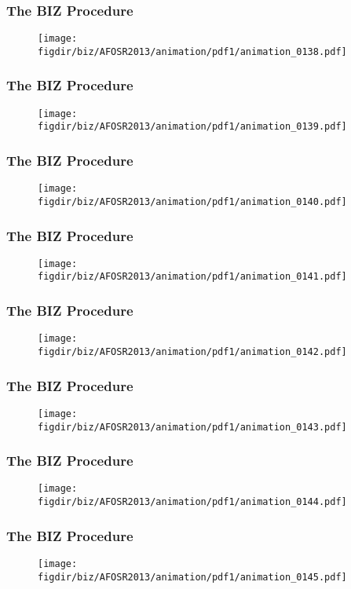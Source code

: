 \documentclass[13pt]{beamer}
\newcommand{\figdir}{../../fig}
\begin{document}
\begin{frame}\frametitle{The BIZ Procedure}\begin{figure}\texttt{[image: \\figdir/biz/AFOSR2013/animation/pdf1/animation\_0138.pdf]}\end{figure}\end{frame}
\begin{frame}\frametitle{The BIZ Procedure}\begin{figure}\texttt{[image: \\figdir/biz/AFOSR2013/animation/pdf1/animation\_0139.pdf]}\end{figure}\end{frame}
\begin{frame}\frametitle{The BIZ Procedure}\begin{figure}\texttt{[image: \\figdir/biz/AFOSR2013/animation/pdf1/animation\_0140.pdf]}\end{figure}\end{frame}
\begin{frame}\frametitle{The BIZ Procedure}\begin{figure}\texttt{[image: \\figdir/biz/AFOSR2013/animation/pdf1/animation\_0141.pdf]}\end{figure}\end{frame}
\begin{frame}\frametitle{The BIZ Procedure}\begin{figure}\texttt{[image: \\figdir/biz/AFOSR2013/animation/pdf1/animation\_0142.pdf]}\end{figure}\end{frame}
\begin{frame}\frametitle{The BIZ Procedure}\begin{figure}\texttt{[image: \\figdir/biz/AFOSR2013/animation/pdf1/animation\_0143.pdf]}\end{figure}\end{frame}
\begin{frame}\frametitle{The BIZ Procedure}\begin{figure}\texttt{[image: \\figdir/biz/AFOSR2013/animation/pdf1/animation\_0144.pdf]}\end{figure}\end{frame}
\begin{frame}\frametitle{The BIZ Procedure}\begin{figure}\texttt{[image: \\figdir/biz/AFOSR2013/animation/pdf1/animation\_0145.pdf]}\end{figure}\end{frame}
\end{document}
